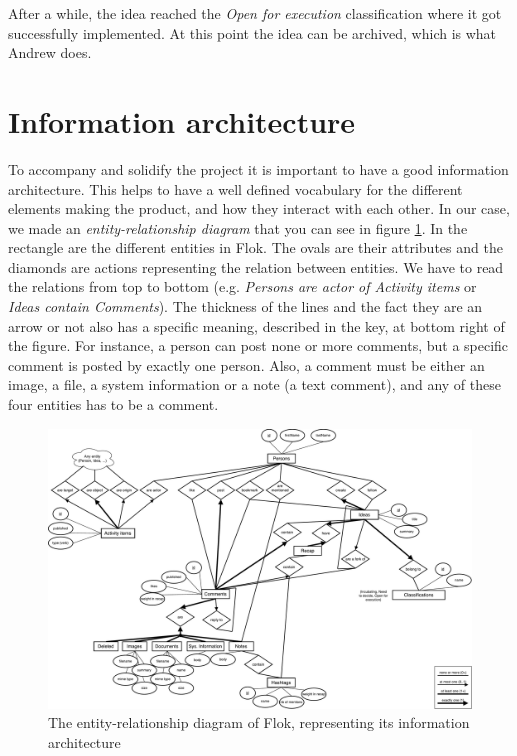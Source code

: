 \documentclass[a4paper,12pt,twoside]{article}
\begin{document}
After a while, the idea reached the \emph{Open for execution} classification where it got successfully implemented.
At this point the idea can be archived, which is what Andrew does.


\section{Information architecture}
To accompany and solidify the project it is important to have a good information architecture.
This helps to have a well defined vocabulary for the different elements making the product, and how they interact with each other.
In our case, we made an \emph{entity-relationship diagram} that you can see in figure \ref{fig.erDiagram}.
In the rectangle are the different entities in Flok.
The ovals are their attributes and the diamonds are actions representing the relation between entities.
We have to read the relations from top to bottom (e.g. \emph{Persons are actor of Activity items} or \emph{Ideas contain Comments}).
The thickness of the lines and the fact they are an arrow or not also has a specific meaning, described in the key, at bottom right of the figure.
For instance, a person can post none or more comments, but a specific comment is posted by exactly one person.
Also, a comment must be either an image, a file, a system information or a note (a text comment), and any of these four entities has to be a comment.

\begin{figure}
    \centering
    \includegraphics[width=\textwidth]{images/erDiagram.pdf}
    \caption{The entity-relationship diagram of Flok, representing its information architecture}
    \label{fig.erDiagram}
\end{figure}
\end{document}
